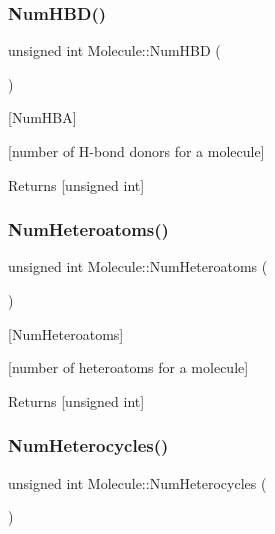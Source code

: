 \subsubsection{\texorpdfstring{Num\+H\+B\+D()}{NumHBD()}}
{\footnotesize\ttfamily unsigned int Molecule\+::\+Num\+H\+BD (\begin{DoxyParamCaption}{ }\end{DoxyParamCaption})}



\mbox{[}Num\+H\+BA\mbox{]} 

\mbox{[}number of H-\/bond donors for a molecule\mbox{]}

\begin{DoxyReturn}{Returns}
\mbox{[}unsigned int\mbox{]} 
\end{DoxyReturn}
\mbox{\label{class_molecule_a582058277ae6808a93cf6ef186037eaa}} 
\subsubsection{\texorpdfstring{Num\+Heteroatoms()}{NumHeteroatoms()}}
{\footnotesize\ttfamily unsigned int Molecule\+::\+Num\+Heteroatoms (\begin{DoxyParamCaption}{ }\end{DoxyParamCaption})}



\mbox{[}Num\+Heteroatoms\mbox{]} 

\mbox{[}number of heteroatoms for a molecule\mbox{]}

\begin{DoxyReturn}{Returns}
\mbox{[}unsigned int\mbox{]} 
\end{DoxyReturn}
\mbox{\label{class_molecule_a9ea5ea968d6b3712d059b33fcd860c94}} 
\subsubsection{\texorpdfstring{Num\+Heterocycles()}{NumHeterocycles()}}
{\footnotesize\ttfamily unsigned int Molecule\+::\+Num\+Heterocycles (\begin{DoxyParamCaption}{ }\end{DoxyParamCaption})}



